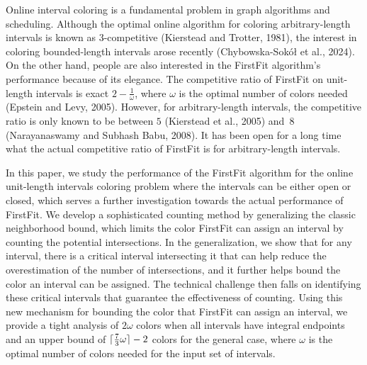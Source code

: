 Online interval coloring is a fundamental problem in graph algorithms and scheduling. 
Although the optimal online algorithm for coloring arbitrary-length intervals is known as $3$-competitive (Kierstead and Trotter, 1981), the interest in coloring bounded-length intervals arose recently (Chybowska-Sok\'{o}\l{} et al., 2024). 
On the other hand, people are also interested in the FirstFit algorithm's performance because of its elegance.
The competitive ratio of FirstFit on unit-length intervals is exact $2-\frac{1}{\omega}$, where $\omega$ is the optimal number of colors needed (Epstein and Levy, 2005).
However, for arbitrary-length intervals, the competitive ratio is only known to be between $5$ (Kierstead et al., 2005) and~$8$ (Narayanaswamy and Subhash Babu, 2008). 
It has been open for a long time what the actual competitive ratio of FirstFit is for arbitrary-length intervals.

In this paper, we study the performance of the FirstFit algorithm for the online unit-length intervals coloring problem where the intervals can be either open or closed, which serves a further investigation towards the actual performance of FirstFit.
We develop a sophisticated counting method by generalizing the classic neighborhood bound, which limits the color FirstFit can assign an interval by counting the potential intersections. 
In the generalization, we show that for any interval, there is a critical interval intersecting it that can help reduce the overestimation of the number of intersections, and it further helps bound the color an interval can be assigned. 
The technical challenge then falls on identifying these critical intervals that guarantee the effectiveness of counting. 
Using this new mechanism for bounding the color that FirstFit can assign an interval, we provide a tight analysis of $2\omega$ colors when all intervals have integral endpoints and an upper bound of $\lceil \frac{7}{3}\omega \rceil - 2$ colors for the general case, where $\omega$ is the optimal number of colors needed for the input set of intervals.
